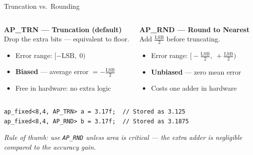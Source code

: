 \documentclass[aspectratio=169,12pt]{beamer}
\begin{document}
\begin{frame}[t,fragile]{Truncation vs.\ Rounding}
\vspace{0.05cm}
\begin{columns}[T,totalwidth=\textwidth]
  \colorbox{Orange!10}{\parbox{\dimexpr\linewidth-2\fboxsep\relax}{%
    \vspace{2pt}
    {\color{Orange}\bfseries AP\_TRN --- Truncation (default)}\\[1pt]
    {\footnotesize\color{Navy} Drop the extra bits --- equivalent to floor.}\\[1pt]
    {\small
    \begin{itemize}\setlength{\itemsep}{1pt}
      \item Error range: $[-\text{LSB},\; 0)$
      \item \textbf{Biased} --- average error $= -\tfrac{\text{LSB}}{2}$
      \item Free in hardware: no extra logic
    \end{itemize}}
    \vspace{1pt}
  }}
  \colorbox{Teal!10}{\parbox{\dimexpr\linewidth-2\fboxsep\relax}{%
    \vspace{2pt}
    {\color{Teal}\bfseries AP\_RND --- Round to Nearest}\\[1pt]
    {\footnotesize\color{Navy} Add $\tfrac{\text{LSB}}{2}$ before truncating.}\\[1pt]
    {\small
    \begin{itemize}\setlength{\itemsep}{1pt}
      \item Error range: $\bigl[-\tfrac{\text{LSB}}{2},\; +\tfrac{\text{LSB}}{2}\bigr)$
      \item \textbf{Unbiased} --- zero mean error
      \item Costs one adder in hardware
    \end{itemize}}
    \vspace{1pt}
  }}
\end{columns}
\vspace{0.1cm}
\begin{lstlisting}
ap_fixed<8,4, AP_TRN> a = 3.17f;  // Stored as 3.125
ap_fixed<8,4, AP_RND> b = 3.17f;  // Stored as 3.1875
\end{lstlisting}
\vspace{0.07cm}
{\small\color{MidGray}\itshape
  Rule of thumb: use \texttt{AP\_RND} unless area is critical ---
  the extra adder is negligible compared to the accuracy gain.}
\end{frame}
\end{document}
